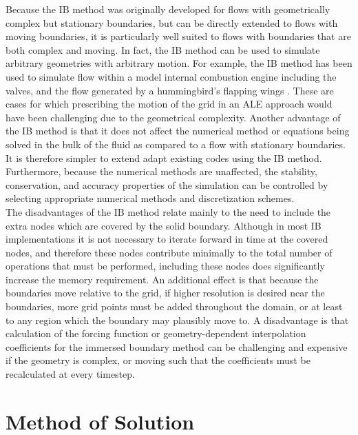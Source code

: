 \documentclass{article}
\begin{document}
Because the IB method was originally developed for flows with geometrically complex but stationary boundaries, but can be directly extended to flows with moving boundaries, it is particularly well suited to flows with boundaries that are both complex and moving. In fact, the IB method can be used to simulate arbitrary geometries with arbitrary motion. For example, the IB method has been used to simulate flow within a model internal combustion engine including the valves, \cite{fadlun2000combined} and the flow generated by a hummingbird's flapping wings \cite{song2014three}. These are cases for which prescribing the motion of the grid in an ALE approach would have been challenging due to the geometrical complexity. Another advantage of the IB method is that it does not affect the numerical method or equations being solved in the bulk of the fluid as compared to a flow with stationary boundaries. It is therefore simpler to extend adapt existing codes using the IB method. Furthermore, because the numerical methods are unaffected, the stability, conservation, and accuracy properties of the simulation can be controlled by selecting appropriate numerical methods and discretization schemes.  \\

The disadvantages of the IB method relate mainly to the need to include the extra nodes which are covered by the solid boundary. Although in most IB implementations it is not necessary to iterate forward in time at the covered nodes, and therefore these nodes contribute minimally to the total number of operations that must be performed, including these nodes does significantly increase the memory requirement. An additional effect is that because the boundaries move relative to the grid, if higher resolution is desired near the boundaries, more grid points must be added throughout the domain, or at least to any region which the boundary may plausibly move to. A disadvantage is that calculation of the forcing function or geometry-dependent interpolation coefficients for the immersed boundary method can be challenging and expensive if the geometry is complex, or moving such that the coefficients must be recalculated at every timestep. 






\section{Method of Solution}
\end{document}
